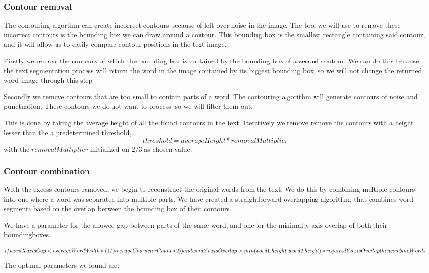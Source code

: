 \documentclass{article}
\begin{document}
\subsubsection{Contour removal}
The contouring algorthm can create incorrect contours because of left-over noise in the image.
The tool we will use to remove these incorrect contours is the bounding box we can draw around a contour.
This bounding box is the smallest rectangle containing said contour, and it will allow us to easily compare contour positions in the text image.

Firstly we remove the contours of which the bounding box is contained by the bounding box of a second contour.
We can do this because the text segmentation process will return the word in the image contained by its biggest bounding box, so we will not change the returned word image through this step  %

Secondly we remove contours that are too small to contain parts of a word.
The contouring algorithm will generate contours of noise and punctuation.
These contours we do not want to process, so we will filter them out.

This is done by taking the average height of all the found contours in the text.
Iteratively we remove remove the contours with a height lesser than the a predetermined threshold,
\vspace{-5px}
\begin{equation}
    threshold = averageHeight * removalMultiplier
\end{equation}
with the $removalMultiplier$ initialized on $2 / 3$ as chosen value.

\subsubsection{Contour combination}
With the excess contours removed, we begin to reconstruct the original words from the text.
We do this by combining multiple contours into one where a word was separated into multiple parts.
We have created a straightforward overlapping algorithm, that combines word segments based on the overlap between the bounding box of their contours.

We have a parameter for the allowed gap between parts of the same word, and one for the minimal y-axis overlap of both their boundingboxes.

\begin{equation} %
    if \\ 
        wordXaxisGap < \\
            averageWordWidth * (1 / (averageCharacterCount * 2) )\\
        and \\
        wordYaxisOverlap > \\
        min(word1.height, word2.height) * requiredYaxisOverlap\\
    then \\
        combineWords
\end{equation}
The optimal parameters we found are: 
\end{document}
